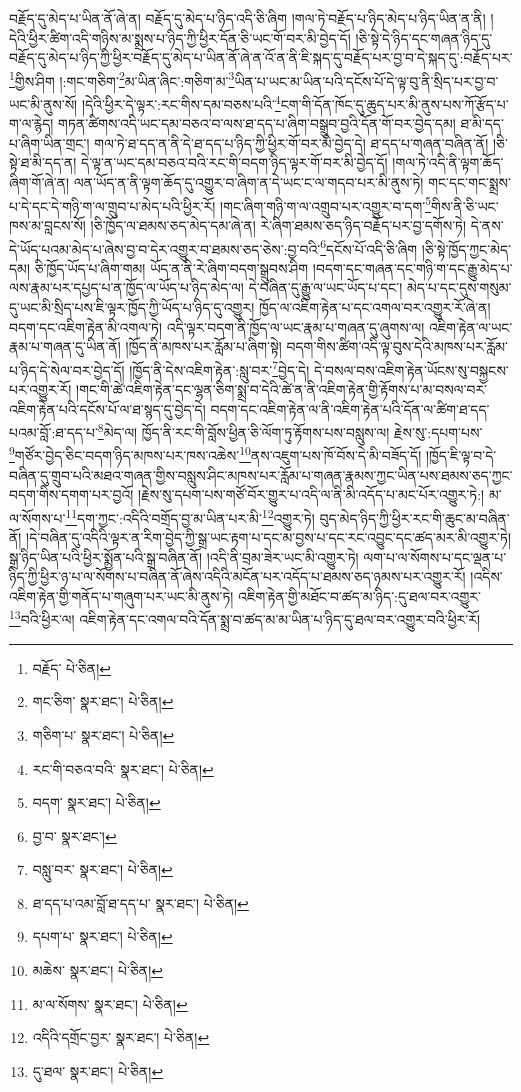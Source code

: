 བརྗོད་དུ་མེད་པ་ཡིན་ནོ་ཞེ་ན། བརྗོད་དུ་མེད་པ་ཉིད་འདི་ཅི་ཞིག །གལ་ཏེ་བརྗོད་པ་ཉིད་མེད་པ་ཉིད་ཡིན་ན་ནི། །དེའི་ཕྱིར་ཚིག་འདི་གཉིས་མ་སྨྲས་པ་ཉིད་ཀྱི་ཕྱིར་དོན་ཅི་ཡང་གོ་བར་མི་བྱེད་དོ། །ཅི་སྟེ་དེ་ཉིད་དང་གཞན་ཉིད་དུ་བརྗོད་དུ་མེད་པ་ཉིད་ཀྱི་ཕྱིར་བརྗོད་དུ་མེད་པ་ཡིན་ནོ་ཞེ་ན་འོ་ན་ནི་ཇི་སྐད་དུ་བརྗོད་པར་བྱ་བ་དེ་སྐད་དུ་:བརྗོད་པར་\footnote{བརྗོད་  པེ་ཅིན། }གྱིས་ཤིག །:གང་གཅིག་\footnote{གང་ཅིག་  སྣར་ཐང་།  པེ་ཅིན། }མ་ཡིན་ཞིང་:གཅིག་མ་\footnote{གཅིག་པ་  སྣར་ཐང་།  པེ་ཅིན། }ཡིན་པ་ཡང་མ་ཡིན་པའི་དངོས་པོ་དེ་ལྟ་བུ་ནི་སྲིད་པར་བྱ་བ་ཡང་མི་ནུས་སོ། །དེའི་ཕྱིར་དེ་ལྟར་:རང་གིས་དམ་བཅས་པའི་\footnote{རང་གི་བཅའ་བའི་  སྣར་ཐང་།  པེ་ཅིན། }ངག་གི་དོན་ཁོང་དུ་ཆུད་པར་མི་ནུས་པས་ཀོ་རྩོད་པ་ག་ལ་རྙེད། གཏན་ཚིགས་འདི་ཡང་དམ་བཅའ་བ་ལས་ཐ་དད་པ་ཞིག་བསྒྲུབ་བྱའི་དོན་གོ་བར་བྱེད་དམ། ཐ་མི་དད་པ་ཞིག་ཡིན་གྲང་། གལ་ཏེ་ཐ་དད་ན་ནི་དེ་ཐ་དད་པ་ཉིད་ཀྱི་ཕྱིར་གོ་བར་མི་བྱེད་དེ། ཐ་དད་པ་གཞན་བཞིན་ནོ། །ཅི་སྟེ་ཐ་མི་དད་ན། དེ་ལྟ་ན་ཡང་དམ་བཅའ་བའི་རང་གི་བདག་ཉིད་ལྟར་གོ་བར་མི་བྱེད་དོ། །གལ་ཏེ་འདི་ནི་ལྟག་ཆོད་ཞིག་གོ་ཞེ་ན། ལན་ཡོད་ན་ནི་ལྟག་ཆོད་དུ་འགྱུར་བ་ཞིག་ན་དེ་ཡང་ང་ལ་གདབ་པར་མི་ནུས་ཏེ། གང་དང་གང་སྨྲས་པ་དེ་དང་དེ་གཉི་ག་ལ་གྲུབ་པ་མེད་པའི་ཕྱིར་རོ། །གང་ཞིག་གཉི་ག་ལ་འགྲུབ་པར་འགྱུར་བ་དག་\footnote{བདག་  སྣར་ཐང་།  པེ་ཅིན། }གིས་ནི་ཅི་ཡང་ཁས་མ་བླངས་སོ། །ཅི་ཁྱོད་ལ་ཐམས་ཅད་མེད་དམ་ཞེ་ན། རེ་ཞིག་ཐམས་ཅད་ཉིད་བརྗོད་པར་བྱ་དགོས་ཏེ། དེ་ནས་དེ་ཡོད་པའམ་མེད་པ་ཞེས་བྱ་བ་དེར་འགྱུར་བ་ཐམས་ཅད་ཅེས་:བྱ་བའི་\footnote{བྱ་བ་  སྣར་ཐང་། }དངོས་པོ་འདི་ཅི་ཞིག །ཅི་སྟེ་ཁྱོད་ཀྱང་མེད་དམ། ཅི་ཁྱོད་ཡོད་པ་ཞིག་གམ། ཡོད་ན་ནི་རེ་ཞིག་བདག་སྒྲུབས་ཤིག །བདག་དང་གཞན་དང་གཉི་ག་དང་རྒྱུ་མེད་པ་ལས་རྣམ་པར་དཔྱད་པ་ན་ཁྱོད་ལ་ཡོད་པ་ཉིད་མེད་ལ། དེ་བཞིན་དུ་རྒྱུ་ལ་ཡང་ཡོད་པ་དང་། མེད་པ་དང་དུས་གསུམ་དུ་ཡང་མི་སྲིད་པས་ཇི་ལྟར་ཁྱོད་ཀྱི་ཡོད་པ་ཉིད་དུ་འགྱུར། ཁྱོད་ལ་འཇིག་རྟེན་པ་དང་འགལ་བར་འགྱུར་རོ་ཞེ་ན། བདག་དང་འཇིག་རྟེན་མི་འགལ་ཏེ། འདི་ལྟར་བདག་ནི་ཁྱོད་ལ་ཡང་རྣམ་པ་གཞན་དུ་ཞུགས་ལ། འཇིག་རྟེན་ལ་ཡང་རྣམ་པ་གཞན་དུ་ཡིན་ནོ། །ཁྱོད་ནི་མཁས་པར་རློམ་པ་ཞིག་སྟེ། བདག་གིས་ཚིག་འདི་ལྟ་བུས་དེའི་མཁས་པར་རློམ་པ་ཉིད་དེ་སེལ་བར་བྱེད་དོ། །ཁྱོད་ནི་དེས་འཇིག་རྟེན་:སླུ་བར་\footnote{བསླུ་བར་  སྣར་ཐང་།  པེ་ཅིན། }བྱེད་དེ། དེ་བསལ་བས་འཇིག་རྟེན་ཡོངས་སུ་བསྐྱངས་པར་འགྱུར་རོ། །གང་གི་ཚེ་འཇིག་རྟེན་དང་ལྷན་ཅིག་སྨྲ་བ་དེའི་ཚེ་ན་ནི་འཇིག་རྟེན་གྱི་རྟོགས་པ་མ་བསལ་བར་འཇིག་རྟེན་པའི་དངོས་པོ་ལ་ཐ་སྙད་དུ་བྱེད་དེ། བདག་དང་འཇིག་རྟེན་ལ་ནི་འཇིག་རྟེན་པའི་དོན་ལ་ཚིག་ཐ་དད་པའམ་བློ་:ཐ་དད་པ་\footnote{ཐ་དད་པ་འམ་བློ་ཐ་དད་པ་  སྣར་ཐང་།  པེ་ཅིན། }མེད་ལ། ཁྱོད་ནི་རང་གི་བློས་ཕྱིན་ཅི་ལོག་ཏུ་རྟོགས་པས་བསླུས་ལ། རྗེས་སུ་:དཔག་པས་\footnote{དཔག་པ་  སྣར་ཐང་།  པེ་ཅིན། }གཙོར་བྱེད་ཅིང་བདག་ཉིད་མཁས་པར་ཁས་འཆེས་\footnote{མཆེས་  སྣར་ཐང་།  པེ་ཅིན། }ནས་འཇུག་པས་ཁོ་བོས་དེ་མི་བཟོད་དོ། །ཁྱོད་ཇི་ལྟ་བ་དེ་བཞིན་དུ་གྲུབ་པའི་མཐའ་གཞན་གྱིས་བསླུས་ཤིང་མཁས་པར་རློམ་པ་གཞན་རྣམས་ཀྱང་ཡིན་པས་ཐམས་ཅད་ཀྱང་བདག་གིས་དགག་པར་བྱའོ། །རྗེས་སུ་དཔག་པས་གཙོ་བོར་གྱུར་པ་འདི་ལ་ནི་མི་འདོད་པ་མང་པོར་འགྱུར་ཏེ:། མ་ལ་སོགས་པ་\footnote{མ་ལ་སོགས་  སྣར་ཐང་།  པེ་ཅིན། }དག་ཀྱང་:འདིའི་བགྲོད་བྱ་མ་ཡིན་པར་མི་\footnote{འདིའི་དགྲོང་བྱར་  སྣར་ཐང་།  པེ་ཅིན། }འགྱུར་ཏེ། བུད་མེད་ཉིད་ཀྱི་ཕྱིར་རང་གི་ཆུང་མ་བཞིན་ནོ། །དེ་བཞིན་དུ་འདིའི་ལྟར་ན་རིག་བྱེད་ཀྱི་སྒྲ་ཡང་རྟག་པ་དང་མ་བྱས་པ་དང་རང་འབྱུང་དང་ཚད་མར་མི་འགྱུར་ཏེ། སྒྲ་ཉིད་ཡིན་པའི་ཕྱིར་སྨྱོན་པའི་སྒྲ་བཞིན་ནོ། །འདི་ནི་བྲམ་ཟེར་ཡང་མི་འགྱུར་ཏེ། ལག་པ་ལ་སོགས་པ་དང་ལྡན་པ་ཉིད་ཀྱི་ཕྱིར་ཉ་པ་ལ་སོགས་པ་བཞིན་ནོ་ཞེས་འདིའི་མངོན་པར་འདོད་པ་ཐམས་ཅད་ཉམས་པར་འགྱུར་རོ། །འདིས་འཇིག་རྟེན་གྱི་གནོད་པ་གཞུག་པར་ཡང་མི་ནུས་ཏེ། འཇིག་རྟེན་གྱི་མཐོང་བ་ཚད་མ་ཉིད་:དུ་ཐལ་བར་འགྱུར་\footnote{དུ་ཐལ་  སྣར་ཐང་།  པེ་ཅིན། }བའི་ཕྱིར་ལ། འཇིག་རྟེན་དང་འགལ་བའི་དོན་སྨྲ་བ་ཚད་མ་མ་ཡིན་པ་ཉིད་དུ་ཐལ་བར་འགྱུར་བའི་ཕྱིར་རོ། 